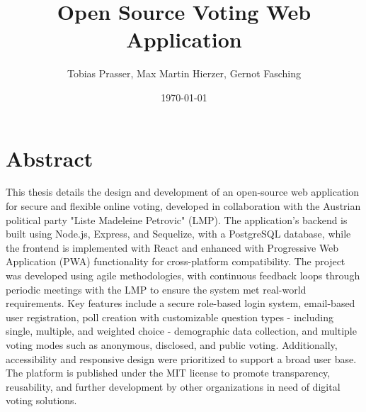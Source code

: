 \documentclass[a4paper,12pt]{report}
\begin{document}
\title{Open Source Voting Web Application}
\author{Tobias Prasser, Max Martin Hierzer, Gernot Fasching}
\date{\today}
\maketitle

\chapter*{Abstract}
This thesis details the design and development of an open-source web application for secure and flexible online voting, developed in collaboration with the Austrian political party "Liste Madeleine Petrovic" (LMP). The application’s backend is built using Node.js, Express, and Sequelize, with a PostgreSQL database, while the frontend is implemented with React and enhanced with Progressive Web Application (PWA) functionality for cross-platform compatibility. The project was developed using agile methodologies, with continuous feedback loops through periodic meetings with the LMP to ensure the system met real-world requirements. Key features include a secure role-based login system, email-based user registration, poll creation with customizable question types - including single, multiple, and weighted choice - demographic data collection, and multiple voting modes such as anonymous, disclosed, and public voting. Additionally, accessibility and responsive design were prioritized to support a broad user base. The platform is published under the MIT license to promote transparency, reusability, and further development by other organizations in need of digital voting solutions.
\newpage

\end{document}
